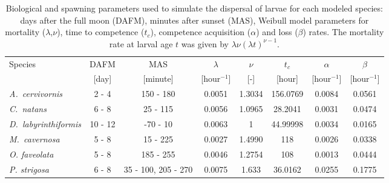 \documentclass[preprint,12pt,authoryear]{elsarticle}
\begin{document}
\begin{table}
    \begin{adjustwidth}{-1in}{-1in}
    \centering
    \footnotesize
    \begin{tabular}{lccccccc}
        \hline
        Species & DAFM  & MAS      &  $\lambda$     & $\nu$ & $t_c$  & $\alpha$      & $\beta$ \\
                & [day] & [minute] &  [hour$^{-1}$] & [-]   & [hour] & [hour$^{-1}$] & [hour$^{-1}$] \\
        \hline
        \textit{A.~cervivornis} & 2 - 4 & 150 - 180 & 0.0051 & 1.3034 & 156.0769 & 0.0084 & 0.0561 \\
        \textit{C.~natans}      & 6 - 8 & 25 - 115  &  0.0056 & 1.0965 & 28.2041 & 0.0031 & 0.0474 \\
        \textit{D.~labyrinthiformis} & 10 - 12 & -70 - 10 & 0.0063 & 1 &  44.99998 & 0.0034 & 0.0165 \\
        \textit{M.~cavernosa}   & 5 - 8 & 15 - 225 & 0.0027 & 1.4990 & 118 & 0.0026 & 0.0338 \\
        \textit{O. faveolata}   & 5 - 8 & 185 - 255 &  0.0046 & 1.2754 & 108 & 0.0013 & 0.0444 \\
        \textit{P. strigosa}    & 6 - 8 &  35 - 100, 205 - 270 & 0.0075 & 1.633 & 36.0162 & 0.0255 & 0.1775 \\
        \hline
    \end{tabular}
    \end{adjustwidth}
    \caption{Biological and spawning parameters used to simulate the dispersal of larvae for each modeled species: days after the full moon (DAFM), minutes after sunset (MAS), Weibull model parameters for mortality ($\lambda$,$\nu$), time to competence ($t_c$), competence acquisition ($\alpha$) and loss ($\beta$) rates. The mortality rate at larval age $t$ was given by $\lambda\nu(\lambda t)^{\nu-1}$.}\label{tab:species}
\end{table}
\end{document}
